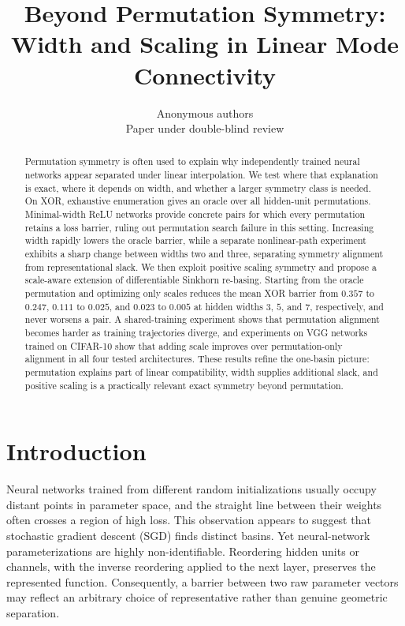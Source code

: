 \documentclass{article}
\title{Beyond Permutation Symmetry: Width and Scaling in Linear Mode Connectivity}
\author{Anonymous authors\\Paper under double-blind review}
\begin{document}
\maketitle

\iclrfinaltrue

\begin{abstract}
Permutation symmetry is often used to explain why independently trained neural
networks appear separated under linear interpolation.  We test where that
explanation is exact, where it depends on width, and whether a larger symmetry
class is needed.  On XOR, exhaustive enumeration gives an oracle over all
hidden-unit permutations.  Minimal-width ReLU networks provide concrete pairs
for which every permutation retains a loss barrier, ruling out permutation
search failure in this setting.  Increasing width rapidly lowers the oracle
barrier, while a separate nonlinear-path experiment exhibits a sharp change
between widths two and three, separating symmetry alignment from
representational slack.  We then exploit positive scaling symmetry and propose
a scale-aware extension of differentiable Sinkhorn re-basing.  Starting from
the oracle permutation and optimizing only scales reduces the mean XOR barrier
from $0.357$ to $0.247$, $0.111$ to $0.025$, and $0.023$ to $0.005$ at hidden
widths $3$, $5$, and $7$, respectively, and never worsens a pair.  A
shared-training experiment shows that permutation alignment becomes harder as
training trajectories diverge, and experiments on VGG networks trained on
CIFAR-10 show that adding scale improves over permutation-only alignment in all
four tested architectures.  These results refine the one-basin picture:
permutation explains part of linear compatibility, width supplies additional
slack, and positive scaling is a practically relevant exact symmetry beyond
permutation.
\end{abstract}

\section{Introduction}

Neural networks trained from different random initializations usually occupy
distant points in parameter space, and the straight line between their weights
often crosses a region of high loss.  This observation appears to suggest that
stochastic gradient descent (SGD) finds distinct basins.  Yet neural-network
parameterizations are highly non-identifiable.  Reordering hidden units or
channels, with the inverse reordering applied to the next layer, preserves the
represented function.  Consequently, a barrier between two raw parameter
vectors may reflect an arbitrary choice of representative rather than genuine
geometric separation.
\end{document}
